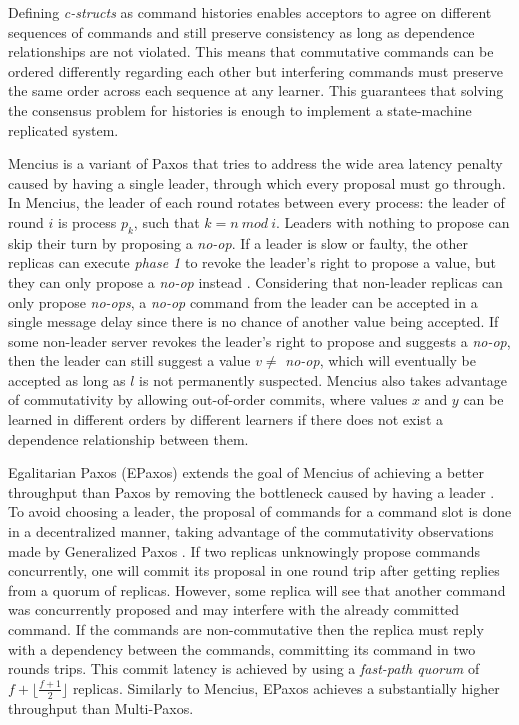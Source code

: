 Defining \textit{c-structs} as command histories enables acceptors to agree on different sequences of commands and still preserve consistency as long as dependence relationships are not violated. This means that commutative commands can be ordered differently regarding each other but interfering commands must preserve the same order across each sequence at any learner. This guarantees that solving the consensus problem for histories is enough to implement a state-machine replicated system. \par
Mencius is a variant of Paxos that tries to address the wide area latency penalty caused by having a single leader, through which every proposal must go through. In Mencius, the leader of each round rotates between every process: the leader of round $i$ is process $p_k$, such that $k = n\ mod\ i$.  Leaders with nothing to propose can skip their turn by proposing a \textit{no-op}. If a leader is slow or faulty, the other replicas can execute \textit{phase 1} to revoke the leader's right to propose a value, but they can only propose a \textit{no-op} instead \cite{Mao2008}. Considering that non-leader replicas can only propose \textit{no-ops}, a \textit{no-op} command from the leader can be accepted in a single message delay since there is no chance of another value being accepted. If some non-leader server revokes the leader's right to propose and suggests a \textit{no-op}, then the leader can still suggest a value $v \neq$ \textit{no-op}, which will eventually be accepted as long as $l$ is not permanently suspected. Mencius also takes advantage of commutativity by allowing out-of-order commits, where values $x$ and $y$ can be learned in different orders by different learners if there does not exist a dependence relationship between them.

Egalitarian Paxos (EPaxos) extends the goal of Mencius of achieving a better throughput than Paxos by removing the bottleneck caused by having a leader \cite{Moraru2013}. To avoid choosing a leader, the proposal of commands for a command slot is done in a decentralized manner, taking advantage of the commutativity observations made by Generalized Paxos \cite{Lamport2005}. If two replicas unknowingly propose commands concurrently, one will commit its proposal in one round trip after getting replies from a quorum of replicas. However, some replica will see that another command was concurrently proposed and may interfere with the already committed command. If the commands are non-commutative then the replica must reply with a dependency between the commands, committing its command in two rounds trips. This commit latency is achieved by using a \textit{fast-path quorum} of $f+\lfloor\frac{f+1}{2}\rfloor$ replicas. Similarly to Mencius, EPaxos achieves a substantially higher throughput than Multi-Paxos.

